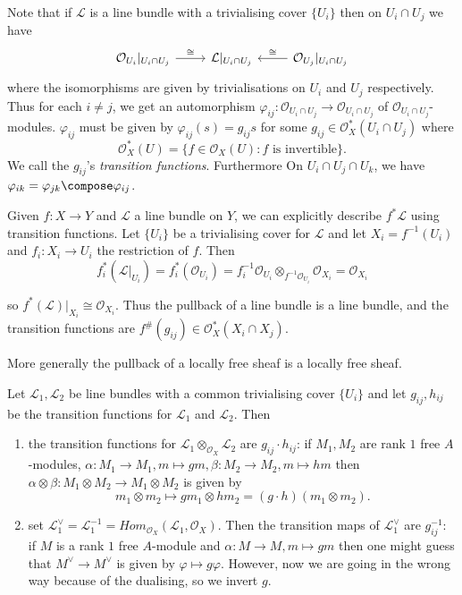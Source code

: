 \documentclass[a4paper]{article}
\newcommand{\sh}[1]{\mathcal{#1}} %
\begin{document}
\begin{eg}
  Note that if \(\sh L\) is a line bundle with a trivialising cover \(\{U_i\}\) then on \(U_i \cap U_j\) we have
  \[
    \begin{tikzcd}
      \sh O_{U_i}|_{U_i \cap U_j} \ar[r, "\cong"] & \sh L|_{U_i \cap U_j} & \sh O_{U_j}|_{U_i \cap U_j} \ar[l, "\cong"']
    \end{tikzcd}
  \]
  where the isomorphisms are given by trivialisations on \(U_i\) and \(U_j\) respectively. Thus for each \(i \neq j\), we get an automorphism \(\varphi_{ij}: \sh O_{U_i \cap U_j} \to \sh O_{U_i \cap U_j}\) of \(\sh O_{U_i \cap U_j}\)-modules. \(\varphi_{ij}\) must be given by \(\varphi_{ij}(s) = g_{ij} s\) for some \(g_{ij} \in \sh O_X^*(U_i \cap U_j)\) where
  \[
    \sh O_X^*(U) = \{f \in \sh O_X(U): f \text{ is invertible}\}.
  \]
  We call the \(g_{ij}\)'s \emph{transition functions}. Furthermore On \(U_i \cap U_j \cap U_k\), we have \(\varphi_{ik} = \varphi_{jk} \compose \varphi_{ij}\).

  Given \(f: X \to Y\) and \(\sh L\) a line bundle on \(Y\), we can explicitly describe \(f^* \sh L\) using transition functions. Let \(\{U_i\}\) be a trivialising cover for \(\sh L\) and let \(X_i = f^{-1}(U_i)\) and \(f_i: X_i \to U_i\) the restriction of \(f\). Then
  \[
    f_i^*(\sh L|_{U_i}) = f_i^*(\sh O_{U_i}) = f_i^{-1} \sh O_{U_i} \otimes_{f^{-1} \sh O_{U_i}} \sh O_{X_i} = \sh O_{X_i}
  \]

  so \(f^*(\sh L)|_{X_i} \cong \sh O_{X_i}\). Thus the pullback of a line bundle is a line bundle, and the transition functions are \(f^\#(g_{ij}) \in \sh O_X^*(X_i \cap X_j)\).

  More generally the pullback of a locally free sheaf is a locally free sheaf.
\end{eg}

\begin{eg}
  Let \(\sh L_1, \sh L_2\) be line bundles with a common trivialising cover \(\{U_i\}\) and let \(g_{ij}, h_{ij}\) be the transition functions for \(\sh L_1\) and \(\sh L_2\). Then
  \begin{enumerate}
  \item the transition functions for \(\sh L_1 \otimes_{\sh O_X} \sh L_2\) are \(g_{ij} \cdot h_{ij}\): if \(M_1, M_2\) are rank \(1\) free \(A\)-modules, \(\alpha: M_1\to M_1, m \mapsto gm, \beta: M_2 \to M_2, m \mapsto hm\) then \(\alpha \otimes \beta: M_1 \otimes M_2 \to M_1 \otimes M_2\) is given by
    \[
      m_1 \otimes m_2 \mapsto gm_1 \otimes hm_2 = (g\cdot h)(m_1 \otimes m_2).
    \]
  \item set \(\sh L_1^\vee = \sh L_1^{-1} = Hom_{\sh O_X}(\sh L_1, \sh O_X)\). Then the transition maps of \(\sh L_1^\vee\) are \(g_{ij}^{-1}\): if \(M\) is a rank \(1\) free \(A\)-module and \(\alpha: M \to M, m \mapsto gm\) then one might guess that \(M^\vee \to M^\vee\) is given by \(\varphi \mapsto g \varphi\). However, now we are going in the wrong way because of the dualising, so we invert \(g\).
  \end{enumerate}
\end{eg}
\end{document}

